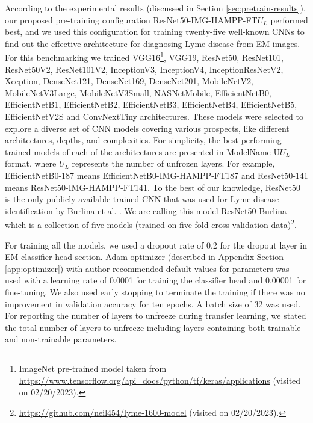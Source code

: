 According to the experimental results (discussed in Section \ref{sec:pretrain-results}), our proposed pre-training configuration ResNet50-IMG-HAMPP-FT$U_L$ performed best, and we used this configuration for training twenty-five well-known CNNs to find out the effective architecture for diagnosing Lyme disease from EM images. For this benchmarking we trained VGG16\footnote{ImageNet pre-trained model taken from \url{https://www.tensorflow.org/api_docs/python/tf/keras/applications} (visited on 02/20/2023).\label{note:model_download}}, VGG19, ResNet50, ResNet101, ResNet50V2, ResNet101V2, InceptionV3, InceptionV4, InceptionResNetV2, Xception, DenseNet121, DenseNet169, DenseNet201, MobileNetV2, MobileNetV3Large, MobileNetV3Small, NASNetMobile, EfficientNetB0, EfficientNetB1, EfficientNetB2, EfficientNetB3, EfficientNetB4, EfficientNetB5, EfficientNetV2S and ConvNextTiny architectures. These models were selected to explore a diverse set of CNN models covering various prospects, like different architectures, depths, and complexities. For simplicity, the best performing trained models of each of the architectures are presented in ModelName-U$U_L$ format, where $U_L$ represents the number of unfrozen layers. For example, EfficientNetB0-187 means EfficientNetB0-IMG-HAMPP-FT187 and ResNet50-141 means ResNet50-IMG-HAMPP-FT141. To the best of our knowledge, ResNet50 is the only publicly available trained CNN that was used for Lyme disease identification by Burlina et al. \cite{Burlina2018}. We are calling this model ResNet50-Burlina which is a collection of five models (trained on five-fold cross-validation data)\footnote{\url{https://github.com/neil454/lyme-1600-model} (visited on 02/20/2023).}.

For training all the models, we used a dropout rate of 0.2 for the dropout layer in EM classifier head section. Adam optimizer (described in Appendix Section \ref{app:optimizer}) with author-recommended default values for parameters was used with a learning rate of 0.0001 for training the classifier head and 0.00001 for fine-tuning. We also used early stopping to terminate the training if there was no improvement in validation accuracy for ten epochs. A batch size of 32 was used. For reporting the number of layers to unfreeze during transfer learning, we stated the total number of layers to unfreeze including layers containing both trainable and non-trainable parameters.

